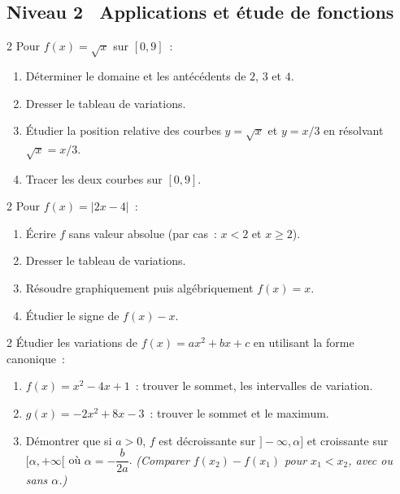\subsection*{\quad Niveau 2 \textemdash\ Applications et \'etude de fonctions}

\begin{exo}{2}
Pour $f(x)=\sqrt{x}$ sur $[0,9]$~:
\begin{enumerate}
  \item D\'eterminer le domaine et les ant\'ec\'edents de $2$, $3$ et $4$.
  \item Dresser le tableau de variations.
  \item \'Etudier la position relative des courbes $y=\sqrt{x}$ et $y=x/3$
        en r\'esolvant $\sqrt{x}=x/3$.
  \item Tracer les deux courbes sur $[0,9]$.
\end{enumerate}
\end{exo}

\begin{exo}{2}
Pour $f(x)=|2x-4|$~:
\begin{enumerate}
  \item \'Ecrire $f$ sans valeur absolue (par cas~: $x<2$ et $x\geq2$).
  \item Dresser le tableau de variations.
  \item R\'esoudre graphiquement puis alg\'ebriquement $f(x)=x$.
  \item \'Etudier le signe de $f(x)-x$.
\end{enumerate}
\end{exo}

\begin{exo}{2}
\'Etudier les variations de $f(x)=ax^2+bx+c$ en utilisant la forme canonique~:
\begin{enumerate}
  \item $f(x)=x^2-4x+1$~: trouver le sommet, les intervalles de variation.
  \item $g(x)=-2x^2+8x-3$~: trouver le sommet et le maximum.
  \item D\'emontrer que si $a>0$, $f$ est d\'ecroissante sur $]-\infty,\alpha]$
        et croissante sur $[\alpha,+\infty[$ o\`u $\alpha=-\dfrac{b}{2a}$.
        \emph{(Comparer $f(x_2)-f(x_1)$ pour $x_1<x_2$, avec ou sans $\alpha$.)}
\end{enumerate}
\end{exo}

